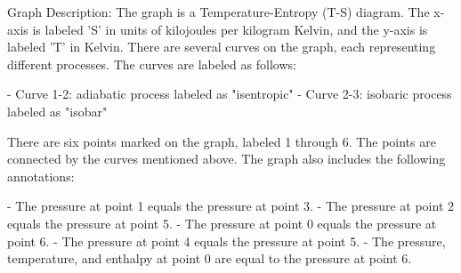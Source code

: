 Graph Description: The graph is a Temperature-Entropy (T-S) diagram. The x-axis is labeled 'S' in units of kilojoules per kilogram Kelvin, and the y-axis is labeled 'T' in Kelvin. There are several curves on the graph, each representing different processes. The curves are labeled as follows:

- Curve 1-2: adiabatic process labeled as "isentropic"
- Curve 2-3: isobaric process labeled as "isobar"

There are six points marked on the graph, labeled 1 through 6. The points are connected by the curves mentioned above. The graph also includes the following annotations:

- The pressure at point 1 equals the pressure at point 3.
- The pressure at point 2 equals the pressure at point 5.
- The pressure at point 0 equals the pressure at point 6.
- The pressure at point 4 equals the pressure at point 5.
- The pressure, temperature, and enthalpy at point 0 are equal to the pressure at point 6.